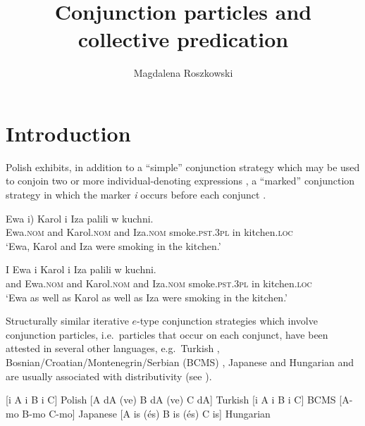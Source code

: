 \documentclass[output=paper]{langscibook}
\author{Magdalena Roszkowski\affiliation{Central European University}}
\title{Conjunction particles and collective predication}
\begin{document}
\maketitle

\section{Introduction}\label{ros:sec:1}


Polish exhibits, in addition to a ``simple'' conjunction strategy which may be used to conjoin two or more individual-denoting expressions , a ``marked'' conjunction strategy in which the marker \textit{i} occurs before each conjunct .

\ea\label{ros:ex1} \gll Ewa \minsp{(} i) Karol i Iza palili w kuchni. \\
Ewa.\textsc{nom} {} and Karol.\textsc{nom} and Iza.\textsc{nom} smoke.\textsc{pst.3pl} in kitchen.\textsc{loc} \\
\glt `Ewa, Karol and Iza were smoking in the kitchen.'
\z 

\ea\label{ros:ex2} \gll I Ewa i Karol i Iza palili w kuchni. \\
and Ewa.\textsc{nom} and Karol.\textsc{nom} and Iza.\textsc{nom} smoke.\textsc{pst.3pl} in kitchen.\textsc{loc} \\
\glt `Ewa as well as Karol as well as Iza were smoking in the kitchen.'
\z 

\noindent Structurally similar iterative $e$-type conjunction strategies which involve conjunction particles, i.e.~particles that occur on each conjunct, have been attested in several other languages, e.g.~Turkish , Bosnian/Croatian/Montenegrin/Serbian (BCMS) , Japanese  and Hungarian  and are usually associated with distributivity (see \citealt{Flor:2017, Mitrovic:2014,Szabolcsi:2015}).

\ea \label{ros:cross}
\ea \label{ros:pl} [i A i B i C]  \hfill Polish
\ex \label{ros:tr} [A dA (ve) B dA (ve) C dA] \hfill Turkish
\ex \label{ros:ser} [i A i B i C] \hfill BCMS
\ex \label{ros:jap} [A-mo B-mo C-mo] \hfill Japanese
\ex \label{ros:hu} [A is (és) B  is (és) C is] \hfill Hungarian
\z\z

\end{document}
